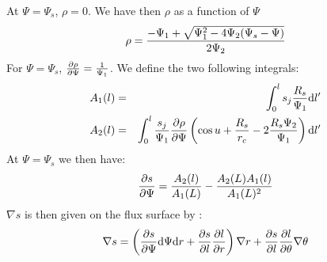 At $\Psi = \Psi_s$, $\rho = 0$. We have then $\rho$ as a function of $\Psi$
\begin{equation}
\rho = {-\Psi_1 + \sqrt{\Psi_1^2 - 4\Psi_2 (\Psi_s - \Psi)} \over 2 \Psi_2}
\end{equation}
For $\Psi = \Psi_s$, $\frac{\partial  \rho}{\partial \Psi} = {1 \over \Psi_1}$.
We define the two following integrals:
\begin{eqnarray}
A_1 (l) &=& \int_0^l {s_j{R_s \over \Psi_1}\mathrm{d}l'} \\
A_2 (l) &=& \int_0^l {{s_j \over \Psi_1}\frac{\partial  \rho}{\partial \Psi}\left(\cos u + {R_s \over r_c} - 2{R_s \Psi_2 \over \Psi_1}\right)\mathrm{d}l'}
\end{eqnarray}
At $\Psi = \Psi_s$ we then have:
\begin{equation}
\frac{\partial  s}{\partial \Psi} = {A_2 (l) \over A_1 (L)} - {A_2 (L) A_1 (l) \over A_1 (L)^2}
\end{equation}
$\nabla s$ is then given on the flux surface by :
\begin{equation}
\nabla s = \left(\frac{\partial  s}{\partial \Psi} {\mathrm{d}\Psi}{\mathrm{d}r} + \frac{\partial  s}{\partial l}\frac{\partial  l}{\partial r} \right) \nabla r + \frac{\partial  s}{\partial l}\frac{\partial  l}{\partial \theta} \nabla \theta
\end{equation}

